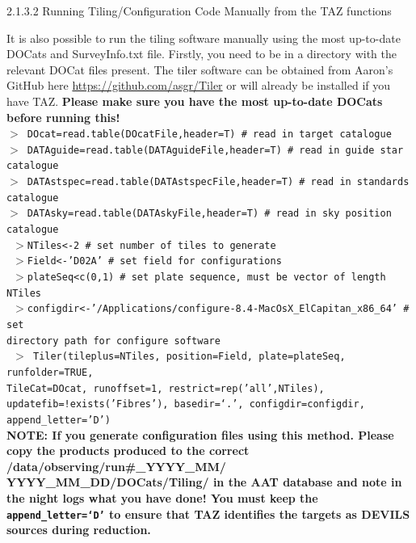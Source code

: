\documentclass[12pt]{article}
\begin{document}
\textsf{2.1.3.2 Running Tiling/Configuration Code Manually from the TAZ functions}
\vspace{2mm}

It is also possible to run the tiling software manually using the most up-to-date DOCats and SurveyInfo.txt file. Firstly, you need to be in a directory with the relevant DOCat files present. The tiler software can be obtained from Aaron's GitHub here \url{https://github.com/asgr/Tiler} or will already be installed if you have TAZ. \textbf{\textcolor{PineGreen}{Please make sure you have the most up-to-date DOCats before running this!}}   \\

\texttt{$>$ DOcat=read.table(DOcatFile,header=T) \# read in target catalogue}\\
\texttt{$>$ DATAguide=read.table(DATAguideFile,header=T)  \# read in guide star catalogue}\\
\texttt{$>$ DATAstspec=read.table(DATAstspecFile,header=T) \# read in standards catalogue}\\
\texttt{$>$ DATAsky=read.table(DATAskyFile,header=T) \# read in sky position catalogue}\\

\texttt{ $>$NTiles<-2 \# set number of tiles to generate }\\
\texttt{ $>$Field<-'D02A'  \# set field for configurations}\\
\texttt{ $>$plateSeq<c(0,1) \# set plate sequence, must be vector of length NTiles}\\
\texttt{ $>$configdir<-'/Applications/configure-8.4-MacOsX\_ElCapitan\_x86\_64'  \# set \\ directory path for configure software}\\

\texttt{ $>$ Tiler(tileplus=NTiles, position=Field, plate=plateSeq, runfolder=TRUE, \\ TileCat=DOcat, runoffset=1, restrict=rep('all',NTiles), \\ updatefib=!exists('Fibres'), basedir=`.', configdir=configdir, \\ append\_letter='D') }\\

\textbf{NOTE: If you generate configuration files using this method. Please copy the products produced to the correct /data/observing/run\#\_YYYY\_MM/ YYYY\_MM\_DD/DOCats/Tiling/ in the AAT database and note in the night logs what you have done! You must keep the \texttt{append\_letter=`D'} to ensure that TAZ identifies the targets as DEVILS sources during reduction.}
\end{document}
